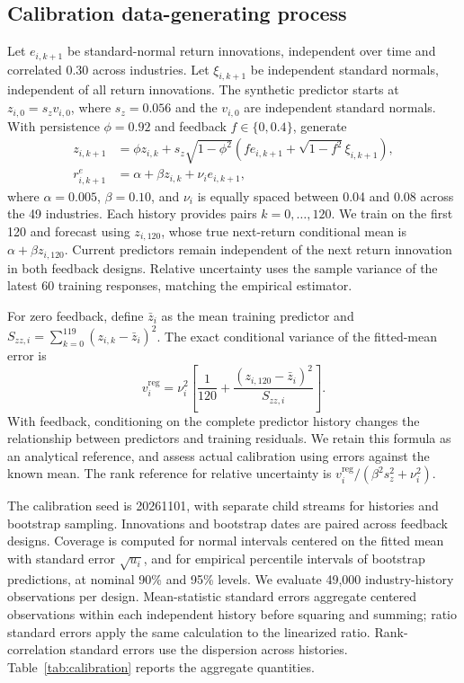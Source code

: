 \subsection{Calibration data-generating process}
Let $e_{i,k+1}$ be standard-normal return innovations, independent over time and correlated 0.30 across industries. Let $\xi_{i,k+1}$ be independent standard normals, independent of all return innovations. The synthetic predictor starts at $z_{i,0}=s_z v_{i,0}$, where $s_z=0.056$ and the $v_{i,0}$ are independent standard normals. With persistence $\phi=0.92$ and feedback $f\in\{0,0.4\}$, generate
\begin{align}
z_{i,k+1}&=\phi z_{i,k}+s_z\sqrt{1-\phi^2}
       \left(fe_{i,k+1}+\sqrt{1-f^2}\xi_{i,k+1}\right),\\
r^e_{i,k+1}&=\alpha+\beta z_{i,k}+\nu_i e_{i,k+1},
\end{align}
where $\alpha=0.005$, $\beta=0.10$, and $\nu_i$ is equally spaced between 0.04 and 0.08 across the 49 industries. Each history provides pairs $k=0,\ldots,120$. We train on the first 120 and forecast using $z_{i,120}$, whose true next-return conditional mean is $\alpha+\beta z_{i,120}$. Current predictors remain independent of the next return innovation in both feedback designs. Relative uncertainty uses the sample variance of the latest 60 training responses, matching the empirical estimator.

For zero feedback, define $\bar z_i$ as the mean training predictor and $S_{zz,i}=\sum_{k=0}^{119}(z_{i,k}-\bar z_i)^2$. The exact conditional variance of the fitted-mean error is
\begin{equation}
v_i^{\mathrm{reg}}=\nu_i^2\left[\frac{1}{120}
 +\frac{(z_{i,120}-\bar z_i)^2}{S_{zz,i}}\right].
\end{equation}
With feedback, conditioning on the complete predictor history changes the relationship between predictors and training residuals. We retain this formula as an analytical reference, and assess actual calibration using errors against the known mean. The rank reference for relative uncertainty is $v_i^{\mathrm{reg}}/(\beta^2s_z^2+\nu_i^2)$.

The calibration seed is 20261101, with separate child streams for histories and bootstrap sampling. Innovations and bootstrap dates are paired across feedback designs. Coverage is computed for normal intervals centered on the fitted mean with standard error $\sqrt{u_i}$, and for empirical percentile intervals of bootstrap predictions, at nominal 90\% and 95\% levels. We evaluate 49,000 industry-history observations per design. Mean-statistic standard errors aggregate centered observations within each independent history before squaring and summing; ratio standard errors apply the same calculation to the linearized ratio. Rank-correlation standard errors use the dispersion across histories. Table~\ref{tab:calibration} reports the aggregate quantities.


